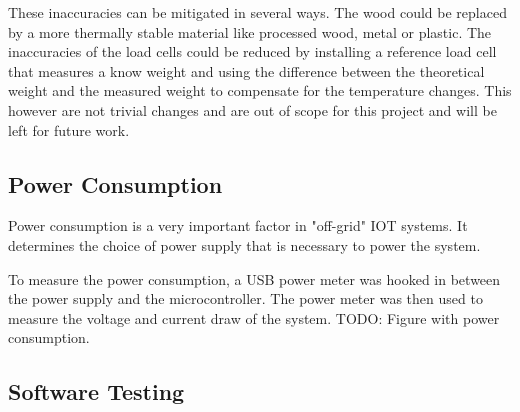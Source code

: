 These inaccuracies can be mitigated in several ways. The wood could be replaced by a more thermally stable material like processed wood, metal or plastic. The inaccuracies of the load cells could be reduced by installing a reference load cell that measures a know weight and using the difference between the theoretical weight and the measured weight to compensate for the temperature changes. This however are not trivial changes and are out of scope for this project and will be left for future work.

\subsection{Power Consumption}
Power consumption is a very important factor in "off-grid" IOT systems. It determines the choice of power supply that is necessary to power the system.

To measure the power consumption, a USB power meter was hooked in between the power supply and the microcontroller. The power meter was then used to measure the voltage and current draw of the system. TODO: Figure with power consumption.



\subsection{Software Testing}